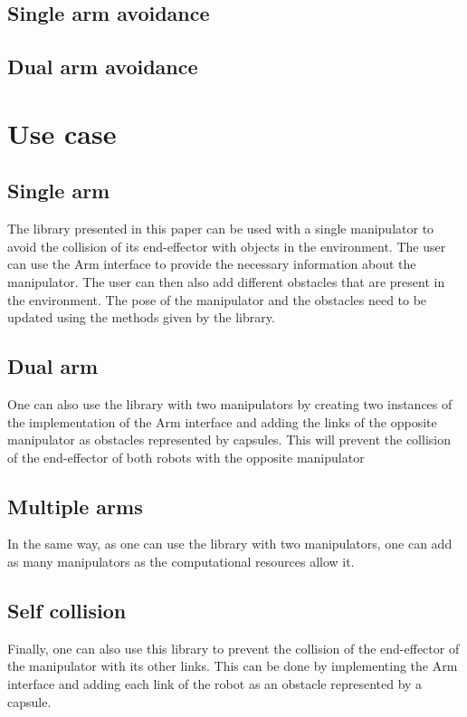 \documentclass[a4paper, 10pt, conference]{ieeeconf}      %
\begin{document}
\subsection{Single arm avoidance} %

\subsection{Dual arm avoidance} %


\section{Use case}

\subsection{Single arm} %
The library presented in this paper can be used with a single manipulator to avoid the collision of its end-effector with objects in the environment.
The user can use the Arm interface to provide the necessary information about the manipulator.
The user can then also add different obstacles that are present in the environment.
The pose of the manipulator and the obstacles need to be updated using the methods given by the library.
\subsection{Dual arm} %
One can also use the library with two manipulators by creating two instances of the implementation of the Arm interface and adding the links of 
the opposite manipulator as obstacles represented by capsules.
This will prevent the collision of the end-effector of both robots with the opposite manipulator
\subsection{Multiple arms}
In the same way, as one can use the library with two manipulators, one can add as many manipulators as the computational resources allow it.
\subsection{Self collision} %
Finally, one can also use this library to prevent the collision of the end-effector of the manipulator with its other links.
This can be done by implementing the Arm interface and adding each link of the robot as an obstacle represented by a capsule.
\end{document}
